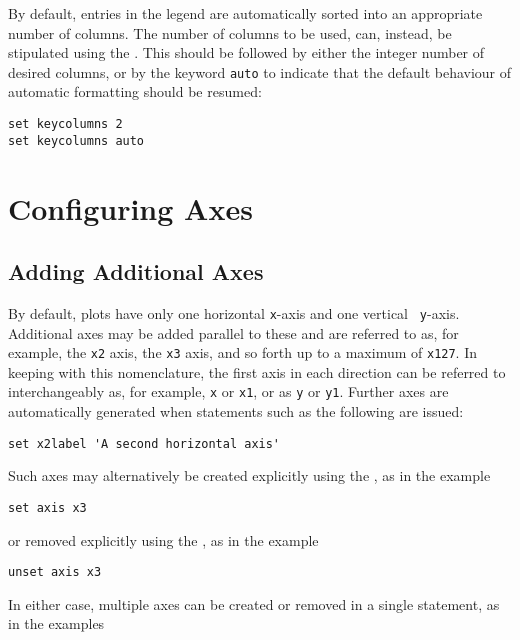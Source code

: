 By default, entries in the legend are automatically sorted into an appropriate
number of columns. The number of columns to be used, can, instead, be
stipulated using the . This should be followed by
either the integer number of desired columns, or by the keyword {\tt auto} to
indicate that the default behaviour of automatic formatting should be resumed:

\begin{verbatim}
set keycolumns 2
set keycolumns auto
\end{verbatim}

\section{Configuring Axes}

\subsection{Adding Additional Axes}
\label{sec:multiple_axes}

By default, plots have only one horizontal {\tt x}-axis and one vertical {\tt
y}-axis.  Additional axes may be added parallel to these and are referred to
as, for example, the {\tt x2} axis, the {\tt x3} axis, and so forth up to a
maximum of {\tt x127}.  In keeping with this nomenclature, the first axis in
each direction can be referred to interchangeably as, for example, {\tt x} or
{\tt x1}, or as {\tt y} or {\tt y1}.  Further axes are automatically generated
when statements such as the following are issued:

\begin{verbatim}
set x2label 'A second horizontal axis'
\end{verbatim}

\noindent Such axes may alternatively be created explicitly using the
, as in the example

\begin{verbatim}
set axis x3
\end{verbatim}

\noindent or removed explicitly using the , as in the
example

\begin{verbatim}
unset axis x3
\end{verbatim}

\noindent In either case, multiple axes can be created or removed in a single
statement, as in the examples

